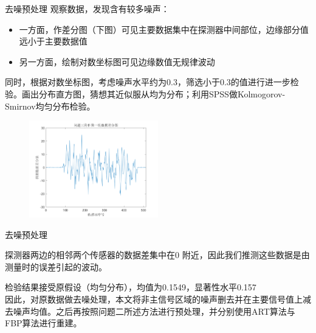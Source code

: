 \documentclass[serif]{beamer} %
\begin{document}
\begin{frame}{去噪预处理}
	\small 观察数据，发现含有较多噪声：
	  
	\begin{itemize}
		  
		\item \small 一方面，作差分图（下图）可见主要数据集中在探测器中间部位，边缘部分值远小于主要数据值
		        
		\item \small 另一方面，绘制对数坐标图可见边缘数值无规律波动
		        
	\end{itemize}
	  
	同时，根据对数坐标图，考虑噪声水平约为0.3，筛选小于0.3的值进行进一步检验。画出分布直方图，猜想其近似服从均为分布；利用SPSS做Kolmogorov-Smirnov均匀分布检验。
	
	\begin{figure}[H]
		\centering
		\includegraphics[width=0.5\textwidth]{./pic/fujian5_1.png}\\
	\end{figure}
\end{frame}
  
  
  
\begin{frame}{去噪预处理}
	  

	\small 探测器两边的相邻两个传感器的数据差集中在0 附近，因此我们推测这些数据是由测量时的误差引起的波动。
	  
	\small 检验结果接受原假设（均匀分布），均值为0.1549，显著性水平0.157\\
	  
	\small 因此，对原数据做去噪处理，本文将非主信号区域的噪声删去并在主要信号值上减去噪声均值。之后再按照问题二所述方法进行预处理，并分别使用ART算法与FBP算法进行重建。
	  
\end{frame}
  
  
  
\end{document}
